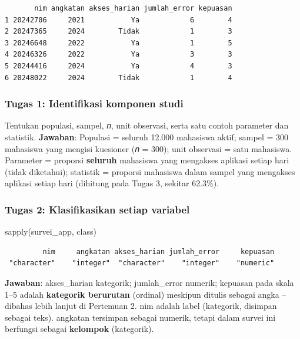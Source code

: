 \documentclass[
  indonesian,
  letterpaper,
]{book}
\newenvironment{Shaded}{\begin{snugshade}}{\end{snugshade}}
\newcommand{\FunctionTok}[1]{\textcolor[rgb]{0.28,0.35,0.67}{#1}}
\newcommand{\NormalTok}[1]{\textcolor[rgb]{0.00,0.23,0.31}{#1}}
\begin{document}
\begin{verbatim}
       nim angkatan akses_harian jumlah_error kepuasan
1 20242706     2021           Ya            6        4
2 20247365     2024        Tidak            1        3
3 20246648     2022           Ya            1        5
4 20246326     2022           Ya            3        3
5 20244416     2024           Ya            4        3
6 20248022     2024        Tidak            1        4
\end{verbatim}

\subsubsection{Tugas 1: Identifikasi komponen
studi}\label{tugas-1-identifikasi-komponen-studi}

Tentukan populasi, sampel, 𝑛, unit observasi, serta satu contoh
parameter dan statistik. \textbf{Jawaban}: Populasi = seluruh 12.000
mahasiswa aktif; sampel = 300 mahasiswa yang mengisi kuesioner (𝑛 =
300); unit observasi = satu mahasiswa. Parameter = proporsi
\textbf{seluruh} mahasiswa yang mengakses aplikasi setiap hari (tidak
diketahui); statistik = proporsi mahasiswa dalam sampel yang mengakses
aplikasi setiap hari (dihitung pada Tugas 3, sekitar 62.3\%).

\subsubsection{Tugas 2: Klasifikasikan setiap
variabel}\label{tugas-2-klasifikasikan-setiap-variabel}

\begin{Shaded}
\begin{Highlighting}[]
\FunctionTok{sapply}\NormalTok{(survei\_app, class)}
\end{Highlighting}
\end{Shaded}

\begin{verbatim}
         nim     angkatan akses_harian jumlah_error     kepuasan 
 "character"    "integer"  "character"    "integer"    "numeric" 
\end{verbatim}

\textbf{Jawaban}: akses\_harian kategorik; jumlah\_error numerik;
kepuasan pada skala 1--5 adalah \textbf{kategorik berurutan} (ordinal)
meskipun ditulis sebagai angka -- dibahas lebih lanjut di Pertemuan 2.
nim adalah label (kategorik, disimpan sebagai teks). angkatan tersimpan
sebagai numerik, tetapi dalam survei ini berfungsi sebagai
\textbf{kelompok} (kategorik).
\end{document}

